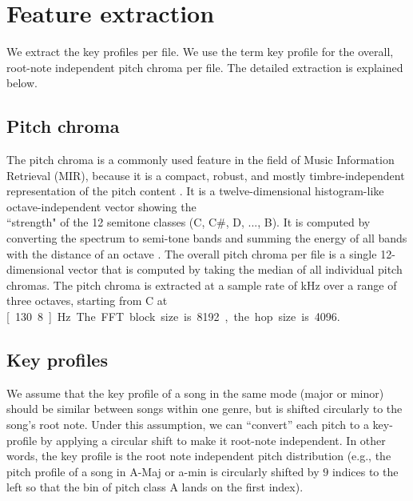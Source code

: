 \documentclass{article}
\begin{document}
\section{Feature extraction}\label{sec:pitch_chroma}
We extract the key profiles per file. We use the term key profile for the overall, root-note independent pitch chroma per file. The detailed extraction is explained below.

\subsection{Pitch chroma}\label{subsec:pc_extract}
The pitch chroma is a commonly used feature in the field of Music Information Retrieval (MIR), because it is a compact, robust, and mostly timbre-independent representation of the pitch content  \cite{muller_information_2007}. It is a twelve-dimensional histogram-like octave-independent vector showing the \\``strength" of the 12 semitone classes (C, C\#, D, ..., B). It is computed by converting the spectrum to semi-tone bands and summing the energy of all bands with the distance of an octave \cite{fujishima_realtime_1999}. 
The overall pitch chroma per file is a single 12-dimensional vector that is computed by taking the median of all individual pitch chromas. 
The pitch chroma is extracted at a sample rate of \unit[10]{kHz} over a range of three octaves, starting from C at \unit[130.8]{Hz}. The FFT block size is 8192, the hop size is 4096.



\subsection{Key profiles}\label{sec:featureset}
We assume that the key profile of a song in the same mode (major or minor) should be similar between songs within one genre, but is shifted circularly to the song's root note. Under this assumption, we can ``convert'' each pitch to a key-profile by applying a circular shift to make it root-note independent. In other words, the key profile is the root note independent pitch distribution (e.g., the pitch profile of a song in A-Maj or a-min is circularly shifted by $9$ indices to the left so that the bin of pitch class A lands on the first index).
\end{document}
